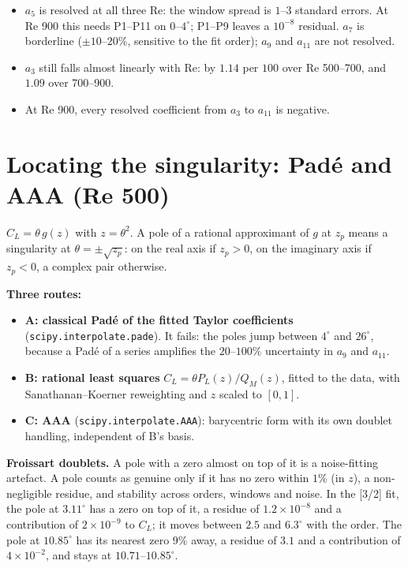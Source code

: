 \documentclass[11pt,a4paper]{article}
\newcommand{\CL}{C_L}
\begin{document}
\begin{itemize}[leftmargin=*]
\item $a_5$ is resolved at all three Re: the window spread is $1$--$3$ standard errors. At Re 900 this
  needs P1--P11 on $0$--$4^\circ$; P1--P9 leaves a $10^{-8}$ residual. $a_7$ is borderline
  ($\pm10$--$20\%$, sensitive to the fit order); $a_9$ and $a_{11}$ are not resolved.
\item $a_3$ still falls almost linearly with Re: by $1.14$ per $100$ over Re 500--700, and $1.09$ over
  700--900.
\item At Re 900, every resolved coefficient from $a_3$ to $a_{11}$ is negative.
\end{itemize}

\section{Locating the singularity: Padé and AAA (Re 500)}\label{sec:pade}

$\CL = \theta\,g(z)$ with $z=\theta^2$. A pole of a rational approximant of $g$ at $z_p$ means a singularity at
$\theta=\pm\sqrt{z_p}$: on the real axis if $z_p>0$, on the imaginary axis if $z_p<0$, a complex pair
otherwise.

\textbf{Three routes:}
\begin{itemize}[leftmargin=*]
\item \textbf{A: classical Padé of the fitted Taylor coefficients} (\texttt{scipy.interpolate.pade}).
  It fails: the poles jump between $4^\circ$ and $26^\circ$, because a Padé of a series amplifies the
  $20$--$100\%$ uncertainty in $a_9$ and $a_{11}$.
\item \textbf{B: rational least squares} $\CL = \theta P_L(z)/Q_M(z)$, fitted to the data, with
  Sanathanan--Koerner reweighting and $z$ scaled to $[0,1]$.
\item \textbf{C: AAA} (\texttt{scipy.interpolate.AAA}): barycentric form with its own doublet handling,
  independent of B's basis.
\end{itemize}

\textbf{Froissart doublets.} A pole with a zero almost on top of it is a noise-fitting artefact. A pole
counts as genuine only if it has no zero within $1\%$ (in $z$), a non-negligible residue, and stability
across orders, windows and noise. In the [3/2] fit, the pole at $3.11^\circ$ has a zero on top of it, a
residue of $1.2\times10^{-8}$ and a contribution of $2\times10^{-9}$ to $\CL$; it moves between $2.5$ and
$6.3^\circ$ with the order. The pole at $10.85^\circ$ has its nearest zero $9\%$ away, a residue of $3.1$ and a
contribution of $4\times10^{-2}$, and stays at $10.71$--$10.85^\circ$.
\end{document}
